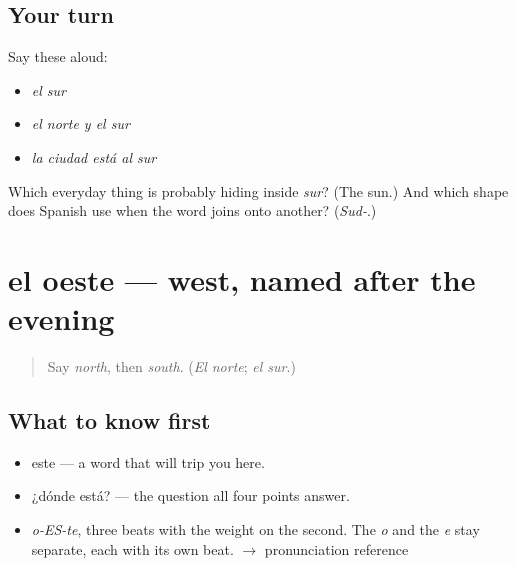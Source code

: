 \subsection*{Your turn}
Say these aloud:

\begin{itemize}
\raggedright
  \item \emph{el sur}
  \item \emph{el norte y el sur}
  \item \emph{la ciudad está al sur}
\end{itemize}

\begin{tcolorbox}[breakable,colback=teal!4,colframe=teal!35!black,title={Before you move on}]
Which everyday thing is probably hiding inside \emph{sur}? (The sun.) And which shape does Spanish use when the word joins onto another? (\emph{Sud-}.)
\end{tcolorbox}
\section[el oeste]{el oeste — west, named after the evening}

\label{lesson:ES-C347-oeste}



\begin{quote}
Say \emph{north}, then \emph{south}. (\emph{El norte}; \emph{el sur}.)
\end{quote}

\subsection*{What to know first}
\begin{itemize}
\raggedright
  \item este — a word that will trip you here.
  \item ¿dónde está? — the question all four points answer.
\end{itemize}

\begin{sounds}
\begin{itemize}
\raggedright
  \item \emph{o-ES-te}, three beats with the weight on the second. The \emph{o} and the \emph{e} stay separate, each with its own beat. $\to$ pronunciation reference
\end{itemize}
\end{sounds}

